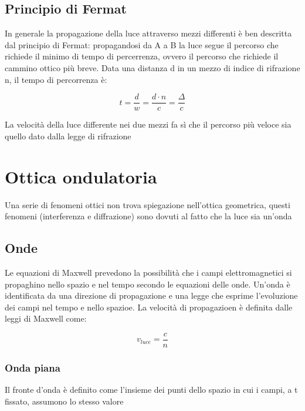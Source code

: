 \documentclass[a4paper,11pt]{report}
\begin{document}
\section{Principio di Fermat}

In generale la propagazione della luce attraverso mezzi differenti è ben descritta dal principio di Fermat: \newline
propagandosi da A a B la luce segue il percorso che richiede il minimo di tempo di percerrenza, ovvero il percorso che richiede il cammino ottico più breve.
Data una distanza d in un mezzo di indice di rifrazione n, il tempo di percorrenza è:

\begin{equation*}
    t = \frac{d}{w} = \frac{d \cdot n}{c} = \frac{\Delta}{c}
\end{equation*}

\noindent La velocità della luce differente nei due mezzi fa sì che il percorso più veloce sia quello dato dalla legge di rifrazione

\chapter{Ottica ondulatoria}

Una serie di fenomeni ottici non trova spiegazione nell'ottica geometrica, questi fenomeni (interferenza e diffrazione) sono dovuti al fatto che la luce sia un'onda

\section{Onde}

Le equazioni di Maxwell prevedono la possibilità che i campi elettromagnetici si propaghino nello spazio e nel tempo secondo le equazioni delle onde.
Un'onda è identificata da una direzione di propagazione e una legge che esprime l'evoluzione dei campi nel tempo e nello spazioe. 
La velocità di propagazioen è definita dalle leggi di Maxwell come:

\begin{equation*}
    v_{luce} = \frac{c}{n}    
\end{equation*}

\subsection*{Onda piana}

Il fronte d'onda è definito come l'insieme dei punti dello spazio in cui i campi, a t fissato, assumono lo stesso valore
\end{document}
